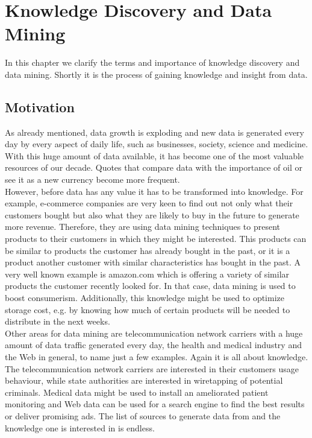 \chapter{Knowledge Discovery and Data Mining}\label{chapter:kdd}
In this chapter we clarify the terms and importance of knowledge discovery and data mining. Shortly it is the process of gaining knowledge and insight from data.
\section{Motivation}
As already mentioned, data growth is exploding and new data is generated every day by every aspect of daily life, such as businesses, society, science and medicine. With this huge amount of data available, it has become one of the most valuable resources of our decade. Quotes that compare data with the importance of oil or see it as a new currency become more frequent.
\\
However, before data has any value it has to be transformed into knowledge. For example, e-commerce companies are very keen to find out not only what their customers bought but also what they are likely to buy in the future to generate more revenue. Therefore, they are using data mining techniques to present products to their customers in which they might be interested. This products can be similar to products the customer has already bought in the past, or it is a product another customer with similar characteristics has bought in the past. A very well known example is amazon.com which is offering a variety of similar products the customer recently looked for. In that case, data mining is used to boost consumerism. Additionally, this knowledge might be used to optimize storage cost, e.g. by knowing how much of certain products will be needed to distribute in the next weeks.
\\
Other areas for data mining are telecommunication network carriers with a huge amount of data traffic generated every day, the health and medical industry and the Web in general, to name just a few examples. Again it is all about knowledge. The telecommunication network carriers are interested in their customers usage behaviour, while state authorities are interested in wiretapping of potential criminals. Medical data might be used to install an ameliorated patient monitoring and Web data can be used for a search engine to find the best results or deliver promising ads. The list of sources to generate data from and the knowledge one is interested in is endless.


